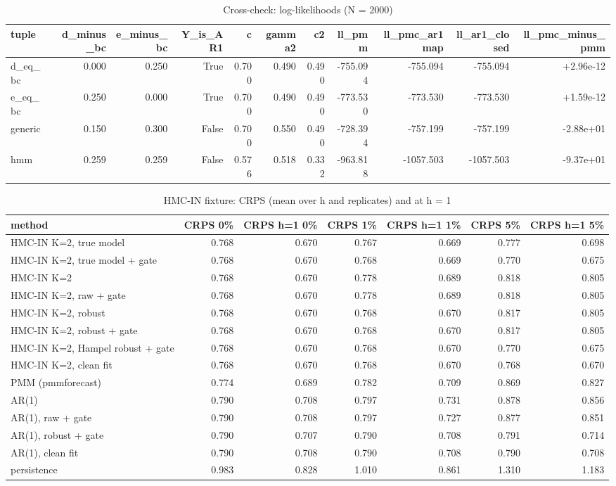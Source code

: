 \begin{table}[ht]\centering\small
\caption{Cross-check: log-likelihoods (N = 2000)}
\begin{tabular}{lrrrrrrrrrr}
\hline
tuple & d\_minus\_bc & e\_minus\_bc & Y\_is\_AR1 & c & gamma2 & c2 & ll\_pmm & ll\_pmc\_ar1map & ll\_ar1\_closed & ll\_pmc\_minus\_pmm \\ \hline
d\_eq\_bc & 0.000 & 0.250 & True & 0.700 & 0.490 & 0.490 & -755.094 & -755.094 & -755.094 & +2.96e-12 \\
e\_eq\_bc & 0.250 & 0.000 & True & 0.700 & 0.490 & 0.490 & -773.530 & -773.530 & -773.530 & +1.59e-12 \\
generic & 0.150 & 0.300 & False & 0.700 & 0.550 & 0.490 & -728.394 & -757.199 & -757.199 & -2.88e+01 \\
hmm & 0.259 & 0.259 & False & 0.576 & 0.518 & 0.332 & -963.818 & -1057.503 & -1057.503 & -9.37e+01 \\
\hline\end{tabular}\end{table}

\begin{table}[ht]\centering\small
\caption{HMC-IN fixture: CRPS (mean over h and replicates) and at h = 1}
\begin{tabular}{lrrrrrr}
\hline
method & CRPS 0\% & CRPS h=1 0\% & CRPS 1\% & CRPS h=1 1\% & CRPS 5\% & CRPS h=1 5\% \\ \hline
HMC-IN K=2, true model & 0.768 & 0.670 & 0.767 & 0.669 & 0.777 & 0.698 \\
HMC-IN K=2, true model + gate & 0.768 & 0.670 & 0.768 & 0.669 & 0.770 & 0.675 \\
HMC-IN K=2 & 0.768 & 0.670 & 0.778 & 0.689 & 0.818 & 0.805 \\
HMC-IN K=2, raw + gate & 0.768 & 0.670 & 0.778 & 0.689 & 0.818 & 0.805 \\
HMC-IN K=2, robust & 0.768 & 0.670 & 0.768 & 0.670 & 0.817 & 0.805 \\
HMC-IN K=2, robust + gate & 0.768 & 0.670 & 0.768 & 0.670 & 0.817 & 0.805 \\
HMC-IN K=2, Hampel robust + gate & 0.768 & 0.670 & 0.768 & 0.670 & 0.770 & 0.675 \\
HMC-IN K=2, clean fit & 0.768 & 0.670 & 0.768 & 0.670 & 0.768 & 0.670 \\
PMM (pmmforecast) & 0.774 & 0.689 & 0.782 & 0.709 & 0.869 & 0.827 \\
AR(1) & 0.790 & 0.708 & 0.797 & 0.731 & 0.878 & 0.856 \\
AR(1), raw + gate & 0.790 & 0.708 & 0.797 & 0.727 & 0.877 & 0.851 \\
AR(1), robust + gate & 0.790 & 0.707 & 0.790 & 0.708 & 0.791 & 0.714 \\
AR(1), clean fit & 0.790 & 0.708 & 0.790 & 0.708 & 0.790 & 0.708 \\
persistence & 0.983 & 0.828 & 1.010 & 0.861 & 1.310 & 1.183 \\
\hline\end{tabular}\end{table}

